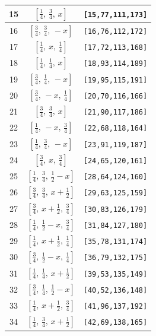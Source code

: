\documentclass[fleqn,8pt]{jsarticle}
\begin{document}
\begin{longtable}{ccc}
15 & $\left[ \frac{1}{4},\, \frac{3}{4},\, x \right]$ & {\tt [15,77,111,173]} \\ \hline
16 & $\left[ \frac{3}{4},\, \frac{3}{4},\, - x \right]$ & {\tt [16,76,112,172]} \\ \hline
17 & $\left[ \frac{1}{4},\, x,\, \frac{1}{4} \right]$ & {\tt [17,72,113,168]} \\ \hline
18 & $\left[ \frac{1}{4},\, \frac{1}{4},\, x \right]$ & {\tt [18,93,114,189]} \\ \hline
19 & $\left[ \frac{3}{4},\, \frac{1}{4},\, - x \right]$ & {\tt [19,95,115,191]} \\ \hline
20 & $\left[ \frac{3}{4},\, - x,\, \frac{1}{4} \right]$ & {\tt [20,70,116,166]} \\ \hline
21 & $\left[ \frac{3}{4},\, \frac{3}{4},\, x \right]$ & {\tt [21,90,117,186]} \\ \hline
22 & $\left[ \frac{1}{4},\, - x,\, \frac{3}{4} \right]$ & {\tt [22,68,118,164]} \\ \hline
23 & $\left[ \frac{1}{4},\, \frac{3}{4},\, - x \right]$ & {\tt [23,91,119,187]} \\ \hline
24 & $\left[ \frac{3}{4},\, x,\, \frac{3}{4} \right]$ & {\tt [24,65,120,161]} \\ \hline
25 & $\left[ \frac{1}{4},\, \frac{3}{4},\, \frac{1}{2} - x \right]$ & {\tt [28,64,124,160]} \\ \hline
26 & $\left[ \frac{3}{4},\, \frac{3}{4},\, x + \frac{1}{2} \right]$ & {\tt [29,63,125,159]} \\ \hline
27 & $\left[ \frac{3}{4},\, x + \frac{1}{2},\, \frac{3}{4} \right]$ & {\tt [30,83,126,179]} \\ \hline
28 & $\left[ \frac{1}{4},\, \frac{1}{2} - x,\, \frac{3}{4} \right]$ & {\tt [31,84,127,180]} \\ \hline
29 & $\left[ \frac{1}{4},\, x + \frac{1}{2},\, \frac{1}{4} \right]$ & {\tt [35,78,131,174]} \\ \hline
30 & $\left[ \frac{3}{4},\, \frac{1}{2} - x,\, \frac{1}{4} \right]$ & {\tt [36,79,132,175]} \\ \hline
31 & $\left[ \frac{1}{4},\, \frac{1}{4},\, x + \frac{1}{2} \right]$ & {\tt [39,53,135,149]} \\ \hline
32 & $\left[ \frac{3}{4},\, \frac{1}{4},\, \frac{1}{2} - x \right]$ & {\tt [40,52,136,148]} \\ \hline
33 & $\left[ \frac{1}{4},\, x + \frac{1}{2},\, \frac{3}{4} \right]$ & {\tt [41,96,137,192]} \\ \hline
34 & $\left[ \frac{1}{4},\, \frac{3}{4},\, x + \frac{1}{2} \right]$ & {\tt [42,69,138,165]} \\ \hline

\end{longtable}
\end{document}
